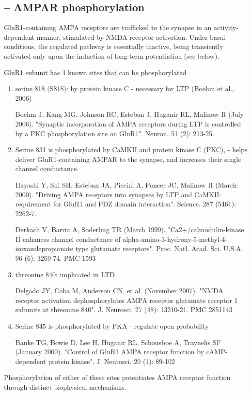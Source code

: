 \subsection{-- AMPAR phosphorylation}
\label{sec:AMPAR-phosphorylation}

GluR1-containing AMPA receptors are trafficked to the synapse in an
activity-dependent manner, stimulated by NMDA receptor activation.
Under basal conditions, the regulated pathway is essentially inactive, being
transiently activated only upon the induction of long-term potentiation (see
below).

GluR1 subunit has 4 known sites that can be phosphorylated
\begin{enumerate}
  
  \item  serine 818 (S818): by protein kinase C - necessary for LTP (Boehm et
  al., 2006)
  
  Boehm J, Kang MG, Johnson RC, Esteban J, Huganir RL, Malinow R (July 2006).
  "Synaptic incorporation of AMPA receptors during LTP is controlled by a PKC
  phosphorylation site on GluR1". Neuron. 51 (2): 213-25.  
  
  \item Serine 831 is phosphorylated by CaMKII and protein kinase C (PKC),
  - helps deliver GluR1-containing AMPAR to the synapse, and  increases their
  single channel conductance.

Hayashi Y, Shi SH, Esteban JA, Piccini A, Poncer JC, Malinow R (March 2000).
"Driving AMPA receptors into synapses by LTP and CaMKII: requirement for GluR1
and PDZ domain interaction". Science. 287 (5461): 2262-7.

Derkach V, Barria A, Soderling TR (March 1999). "Ca2+/calmodulin-kinase II
enhances channel conductance of
alpha-amino-3-hydroxy-5-methyl-4-isoxazolepropionate type glutamate receptors".
Proc. Natl. Acad. Sci. U.S.A. 96 (6): 3269-74. PMC 1593

  \item  threonine 840:  implicated in LTD 

Delgado JY, Coba M, Anderson CN, et al. (November 2007). "NMDA receptor
activation dephosphorylates AMPA receptor glutamate receptor 1 subunits at
threonine 840". J. Neurosci. 27 (48): 13210-21. PMC 2851143  
  
  \item Serine 845 is phosphorylated by PKA - regulate open probability
  
  Banke TG, Bowie D, Lee H, Huganir RL, Schousboe A, Traynelis SF (January
  2000). "Control of GluR1 AMPA receptor function by cAMP-dependent protein
  kinase". J. Neurosci. 20 (1): 89-102 
  
\end{enumerate}
Phosphorylation of either of these sites potentiates AMPA receptor function
through distinct biophysical mechanisms.

